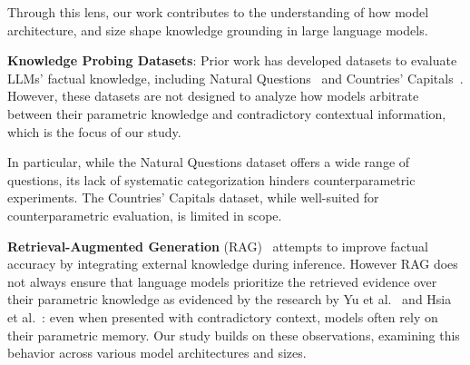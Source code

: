 Through this lens, our work contributes to the understanding of how model architecture, and size shape knowledge grounding in large language models.

\textbf{Knowledge Probing Datasets}: Prior work has developed datasets to evaluate LLMs' factual knowledge, including Natural Questions~\cite{natural_questions} and Countries' Capitals~\cite{factual_recall}. However, these datasets are not designed to analyze how models arbitrate between their parametric knowledge and contradictory contextual information, which is the focus of our study.

In particular, while the Natural Questions dataset offers a wide range of questions, its lack of systematic categorization hinders counterparametric experiments.
The Countries' Capitals dataset, while well-suited for counterparametric evaluation, is limited in scope.

\textbf{Retrieval-Augmented Generation} (RAG)~\cite{rag} attempts to improve factual accuracy by integrating external knowledge during inference.
However RAG does not always ensure that language models prioritize the retrieved evidence over their parametric knowledge as evidenced by the research by Yu et al.~\cite{factual_recall} and Hsia et al.~\cite{ragged}: even when presented with contradictory context, models often rely on their parametric memory.
Our study builds on these observations, examining this behavior across various model architectures and sizes.
